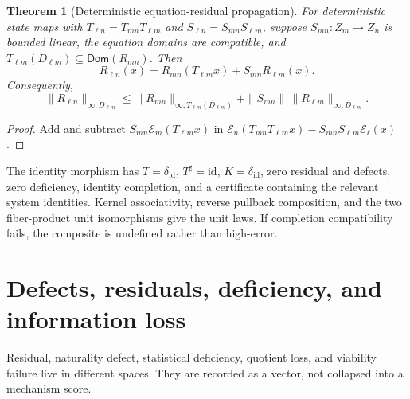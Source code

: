 \documentclass[11pt,a4paper]{article}
\theoremstyle{definition}
\theoremstyle{plain}
\newtheorem{theorem}[definition]{Theorem}
\theoremstyle{remark}
\newcommand{\Id}{\mathrm{id}}
\begin{document}
\begin{theorem}[Deterministic equation-residual propagation]\label{thm:residual}
For deterministic state maps with
\(T_{\ell n}=T_{mn}T_{\ell m}\) and
\(S_{\ell n}=S_{mn}S_{\ell m}\), suppose \(S_{mn}:Z_m\to Z_n\) is bounded
linear, the equation domains are compatible, and
\(T_{\ell m}(D_{\ell m})\subseteq\mathsf{Dom}(R_{mn})\).  Then
\[
R_{\ell n}(x)
=R_{mn}(T_{\ell m}x)+S_{mn}R_{\ell m}(x).
\]
Consequently,
\[
\|R_{\ell n}\|_{\infty,D_{\ell m}}
\le \|R_{mn}\|_{\infty,T_{\ell m}(D_{\ell m})}
 +\|S_{mn}\|\,\|R_{\ell m}\|_{\infty,D_{\ell m}} .
\]
\end{theorem}
\begin{proof}
Add and subtract
\(S_{mn}\mathcal E_m(T_{\ell m}x)\) in
\(\mathcal E_n(T_{mn}T_{\ell m}x)
-S_{mn}S_{\ell m}\mathcal E_\ell(x)\).
\end{proof}

The identity morphism has \(T=\delta_{\Id}\), \(T^\sharp=\Id\),
\(K=\delta_{\Id}\), zero residual and defects, zero deficiency, identity
completion, and a certificate containing the relevant system identities.
Kernel associativity, reverse pullback composition, and the two fiber-product
unit isomorphisms give the unit laws.  If completion compatibility fails, the
composite is undefined rather than high-error.

\section{Defects, residuals, deficiency, and information loss}\label{sec:defects}

Residual, naturality defect, statistical deficiency, quotient loss, and
viability failure live in different spaces.  They are recorded as a vector,
not collapsed into a mechanism score.
\end{document}
